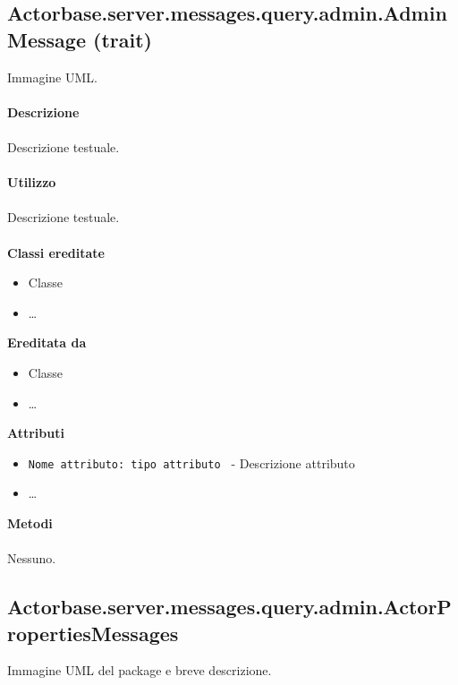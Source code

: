 \documentclass[a4paper]{article}
\begin{document}
\subsection{Actorbase.server.messages.query.admin.AdminMessage (trait)}
		Immagine UML.
		\\ \\
		\textbf{Descrizione}
			\\ \\
			Descrizione testuale.
			\\ \\
		\textbf{Utilizzo}
			\\ \\
			Descrizione testuale.
			\\ \\
		\textbf{Classi ereditate}
			\begin{itemize}
				\item Classe
				\item \dots
			\end{itemize}
		\textbf{Ereditata da}
			\begin{itemize}
				\item Classe
				\item \dots
			\end{itemize}
		\textbf{Attributi}
			\begin{itemize}
				\item \texttt{Nome attributo: tipo attributo } - Descrizione attributo
				\item \dots
			\end{itemize}
		\textbf{Metodi}
			\\ \\
			Nessuno.
		
	\subsection{Actorbase.server.messages.query.admin.ActorPropertiesMessages}
		Immagine UML del package e breve descrizione.
		
\end{document}

